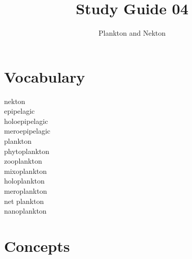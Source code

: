 \documentclass[nofonts, letterpaper]{tufte-handout}
\title{Study Guide 04}
\author{Plankton and Nekton}
\date{} %
\begin{document}
\maketitle	%


\section{Vocabulary}
\vspace{-1\baselineskip}
\begin{multicols}{2}
nekton \\
epipelagic \\
holoepipelagic \\
meroepipelagic \\
plankton \\
phytoplankton \\
zooplankton \\
mixoplankton \\
holoplankton \\
meroplankton \\
net plankton \\
nanoplankton \
\end{multicols}

\section{Concepts}
\end{document}
